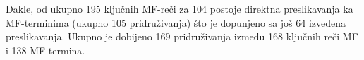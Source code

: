Dakle, od ukupno 195 ključnih MF-reči  za 104 postoje direktna preslikavanja ka
MF-terminima (ukupno 105 pridruživanja) što je dopunjeno sa još  64 izvedena
preslikavanja.  Ukupno je dobijeno 169 pridruživanja između 168 ključnih reči
MF i 138 MF-termina.



%
%
%




